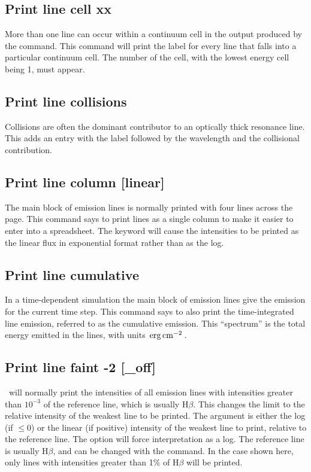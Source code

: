 \subsection{Print line cell xx}

More than one line can occur within a continuum cell in the output
produced by the  command.
This command will print the label for every line that falls into a particular
continuum cell.
The number of the cell, with the lowest energy cell being 1,
must appear.

\subsection{Print line collisions}

Collisions are often the dominant contributor to an optically thick
resonance line.
This adds an entry with the label 
followed by the wavelength and the collisional contribution.

\subsection{Print line column [linear]}

The main block of emission lines is normally printed with four lines
across the page.
This command says to print lines as a single column to
make it easier to enter into a spreadsheet.
The keyword  will cause
the intensities to be printed as the linear flux in exponential format rather than as the log.

\subsection{Print line cumulative}
\label{sec:CommandPrintLineCumulative}

In a time-dependent simulation the main block of emission
lines give the emission for the current time step.
This command says to also print the time-integrated line emission,
referred to as the cumulative emission.
This ``spectrum'' is the total energy emitted in the lines,
with units $\mbox{${\rm\thinspace erg}{\rm\thinspace cm}^{-2}\,$}$.

\subsection{Print line faint -2 [\_off]}

\Cloudy\ will normally print the intensities of all emission lines with
intensities greater than $10^{-3}$ of the reference line,
which is usually H$\beta$.
This changes the limit to the relative intensity of the weakest line to
be printed.
The argument is either the log (if $\le 0$) or the linear (if
positive) intensity of the weakest line to print, relative to the reference line.
The  option will force interpretation as a log.
The reference
line is usually H$\beta$,
and can be changed with the  command.
In the case shown here, only lines with intensities
greater than 1\% of H$\beta$ will be printed.

